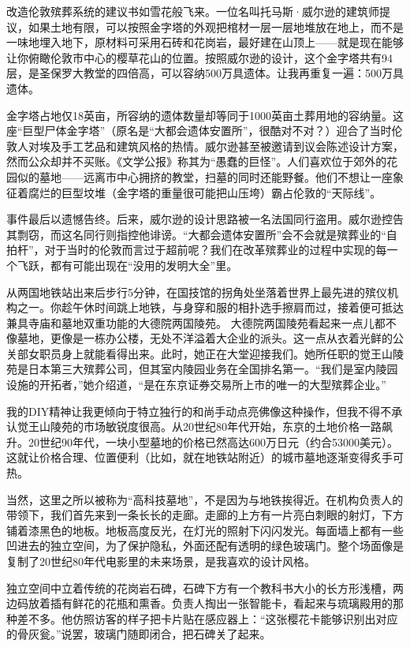 \documentclass[12pt,oneside]{book}
\begin{document}
改造伦敦殡葬系统的建议书如雪花般飞来。一位名叫托马斯·威尔逊的建筑师提议，如果土地有限，可以按照金字塔的外观把棺材一层一层地堆放在地上，而不是一味地埋入地下，原材料可采用石砖和花岗岩，最好建在山顶上——就是现在能够让你俯瞰伦敦市中心的樱草花山的位置。按照威尔逊的设计，这个金字塔共有94层，是圣保罗大教堂的四倍高，可以容纳500万具遗体。让我再重复一遍：500万具遗体。

金字塔占地仅18英亩，所容纳的遗体数量却等同于1000英亩土葬用地的容纳量。这座“巨型尸体金字塔”（原名是“大都会遗体安置所”，很酷对不对？）迎合了当时伦敦人对埃及手工艺品和建筑风格的热情。威尔逊甚至被邀请到议会陈述设计方案，然而公众却并不买账。《文学公报》称其为“愚蠢的巨怪”。人们喜欢位于郊外的花园似的墓地——远离市中心拥挤的教堂，扫墓的同时还能野餐。他们不想让一座象征着腐烂的巨型坟堆（金字塔的重量很可能把山压垮）霸占伦敦的“天际线”。

事件最后以遗憾告终。后来，威尔逊的设计思路被一名法国同行盗用。威尔逊控告其剽窃，而这名同行则指控他诽谤。“大都会遗体安置所”会不会就是殡葬业的“自拍杆”，对于当时的伦敦而言过于超前呢？我们在改革殡葬业的过程中实现的每一个飞跃，都有可能出现在“没用的发明大全”里。

从两国地铁站出来后步行5分钟，在国技馆的拐角处坐落着世界上最先进的殡仪机构之一。你趁午休时间跳上地铁，与身穿和服的相扑选手擦肩而过，接着便可抵达兼具寺庙和墓地双重功能的大德院两国陵苑。
大德院两国陵苑看起来一点儿都不像墓地，更像是一栋办公楼，无处不洋溢着大企业的派头。这一点从衣着光鲜的公关部女职员身上就能看得出来。此时，她正在大堂迎接我们。她所任职的觉王山陵苑是日本第三大殡葬公司，但其室内陵园业务在全国排名第一。“我们是室内陵园设施的开拓者，”她介绍道，“是在东京证券交易所上市的唯一的大型殡葬企业。”

我的DIY精神让我更倾向于特立独行的和尚手动点亮佛像这种操作，但我不得不承认觉王山陵苑的市场敏锐度很高。从20世纪80年代开始，东京的土地价格一路飙升。20世纪90年代，一块小型墓地的价格已然高达600万日元（约合53000美元）。这就让价格合理、位置便利（比如，就在地铁站附近）的城市墓地逐渐变得炙手可热。

当然，这里之所以被称为“高科技墓地”，不是因为与地铁挨得近。在机构负责人的带领下，我们首先来到一条长长的走廊。走廊的上方有一片亮白刺眼的射灯，下方铺着漆黑色的地板。地板高度反光，在灯光的照射下闪闪发光。每面墙上都有一些凹进去的独立空间，为了保护隐私，外面还配有透明的绿色玻璃门。整个场面像是复制了20世纪80年代电影里的未来场景，是我喜欢的设计风格。

独立空间中立着传统的花岗岩石碑，石碑下方有一个教科书大小的长方形浅槽，两边码放着插有鲜花的花瓶和熏香。负责人掏出一张智能卡，看起来与琉璃殿用的那种差不多。他仿照访客的样子把卡片贴在感应器上：“这张樱花卡能够识别出对应的骨灰瓮。”说罢，玻璃门随即闭合，把石碑关了起来。
\end{document}
